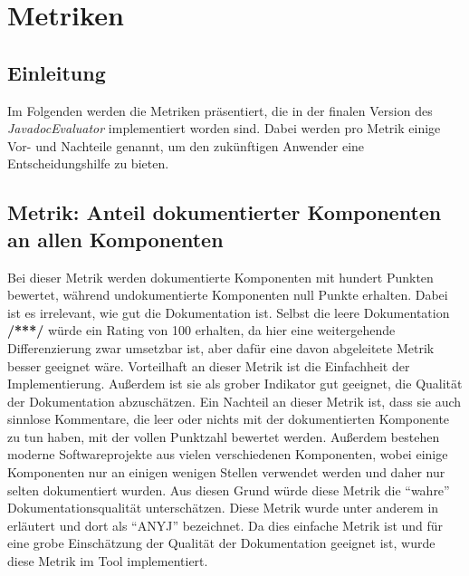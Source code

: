\section{Metriken}
\subsection{Einleitung}
Im Folgenden werden die Metriken präsentiert, die in der finalen Version des \textit{JavadocEvaluator} implementiert worden sind. Dabei werden pro Metrik einige Vor- und Nachteile genannt, um den zukünftigen Anwender eine Entscheidungshilfe zu bieten. 
\subsection{Metrik: Anteil dokumentierter Komponenten an allen Komponenten}
Bei dieser Metrik werden dokumentierte Komponenten mit hundert Punkten bewertet, während undokumentierte Komponenten null Punkte erhalten. Dabei ist es irrelevant, wie gut die Dokumentation ist. Selbst die leere Dokumentation \textbf{/***/} würde ein Rating von 100 erhalten, da hier eine weitergehende Differenzierung zwar umsetzbar ist, aber dafür eine davon abgeleitete Metrik besser geeignet wäre. Vorteilhaft an dieser Metrik ist die Einfachheit der Implementierung. Außerdem ist sie als grober Indikator gut geeignet, die Qualität der Dokumentation abzuschätzen. Ein Nachteil an dieser Metrik ist, dass sie auch sinnlose Kommentare, die leer oder nichts mit der dokumentierten Komponente zu tun haben, mit der vollen Punktzahl bewertet werden. Außerdem bestehen moderne Softwareprojekte aus vielen verschiedenen Komponenten, wobei einige Komponenten nur an einigen wenigen Stellen verwendet werden und daher nur selten dokumentiert wurden. Aus diesen Grund würde diese Metrik die \enquote{wahre} Dokumentationsqualität unterschätzen. 
Diese Metrik wurde unter anderem in \cite[S. 5]{HowDocumentationEvolvesoverTime} erläutert und dort als \enquote{ANYJ} bezeichnet. Da dies einfache Metrik ist und für eine grobe Einschätzung der Qualität der Dokumentation geeignet ist, wurde diese Metrik im Tool implementiert.

